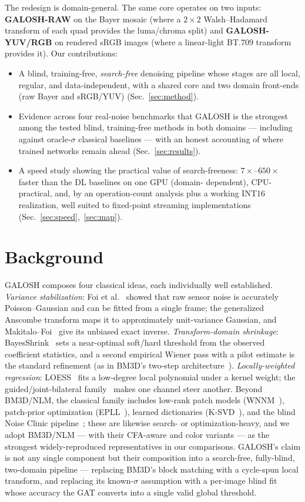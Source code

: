 \documentclass[10pt,twocolumn]{article}
\begin{document}
The redesign is domain-general. The same core operates on two inputs:
\textbf{GALOSH-RAW} on the Bayer mosaic (where a $2{\times}2$ Walsh--Hadamard
transform of each quad provides the luma/chroma split) and
\textbf{GALOSH-YUV/RGB} on rendered sRGB images (where a linear-light BT.709
transform provides it). Our contributions:
\begin{itemize}\itemsep2pt
\item A blind, training-free, \emph{search-free} denoising pipeline whose
stages are all local, regular, and data-independent, with a shared core and two
domain front-ends (raw Bayer and sRGB/YUV) (Sec.~\ref{sec:method}).
\item Evidence across four real-noise benchmarks that GALOSH is the strongest
among the tested blind, training-free methods in both domains --- including
against
oracle-$\sigma$ classical baselines --- with an honest accounting of where
trained networks remain ahead (Sec.~\ref{sec:results}).
\item A speed study showing the practical value of search-freeness:
$7\times$--$650\times$ faster than the DL baselines on one GPU (domain-%
dependent), CPU-practical, and,
by an operation-count analysis plus a working INT16 realization, well suited
to fixed-point streaming implementations (Sec.~\ref{sec:speed},~\ref{sec:map}).
\end{itemize}

\section{Background}
GALOSH composes four classical ideas, each individually well established.
\emph{Variance stabilization}: Foi et al.~\cite{foi} showed that raw sensor
noise is accurately Poisson--Gaussian and can be fitted from a single frame;
the generalized Anscombe transform maps it to approximately unit-variance
Gaussian, and Makitalo--Foi~\cite{makitalo} give its unbiased exact inverse.
\emph{Transform-domain shrinkage}: BayesShrink~\cite{bayesshrink} sets a
near-optimal soft/hard threshold from the observed coefficient statistics, and
a second empirical Wiener pass with a pilot estimate is the standard refinement
(as in BM3D's two-step architecture~\cite{bm3d}).
\emph{Locally-weighted regression}: LOESS~\cite{loess} fits a low-degree local
polynomial under a kernel weight; the guided/joint-bilateral
family~\cite{kopf,guidedfilter} makes one channel steer another.
Beyond BM3D/NLM, the classical family includes low-rank patch models
(WNNM~\cite{wnnm}), patch-prior optimization (EPLL~\cite{epll}), learned
dictionaries (K-SVD~\cite{ksvd}), and the blind Noise Clinic
pipeline~\cite{noiseclinic}; these are likewise search- or optimization-heavy,
and we adopt BM3D/NLM --- with their CFA-aware and color variants --- as the
strongest widely-reproduced representatives in our comparisons.
GALOSH's claim is not any single component but their composition into a
search-free, fully-blind, two-domain pipeline --- replacing BM3D's block
matching with a cycle-spun local transform, and replacing its known-$\sigma$
assumption with a per-image blind fit whose accuracy the GAT converts into a
single valid global threshold.
\end{document}
